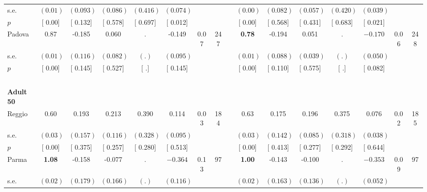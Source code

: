 \begin{longtable}{L{8em} c c c c c c c p{1em} c c c c c c c}
\quad \quad \quad \quad s.e.& $ (     0.01)$ & $ (    0.093)$ & $ (    0.086)$ & $ (    0.416)$ & $ (    0.074)$ & & & & $ (     0.00)$ & $ (    0.082)$ & $ (    0.057)$ & $ (    0.420)$ & $ (    0.039)$ & &  \\*
\quad \quad \quad \quad $ p$ & [     0.00] & [    0.132] & [    0.578] & [    0.697] & [    0.012] & & & & [     0.00] & [    0.568] & [    0.431] & [    0.683] & [    0.021] & &  \\[1em]
\quad \quad \quad Padova& 0.87 &    -0.185 &     0.060 &         . &    -0.149 &      0.07 &       247 & & \textbf{     0.78} &    -0.194 &     0.051 &         . & $ \mathbf{   -0.170}$ &      0.06 &       248  \\*
\quad \quad \quad \quad s.e.& $ (     0.01)$ & $ (    0.116)$ & $ (    0.082)$ & $ (        .)$ & $ (    0.095)$ & & & & $ (     0.01)$ & $ (    0.088)$ & $ (    0.039)$ & $ (        .)$ & $ (    0.050)$ & &  \\*
\quad \quad \quad \quad $ p$ & [     0.00] & [    0.145] & [    0.527] & [        .] & [    0.145] & & & & [     0.00] & [    0.110] & [    0.575] & [        .] & [    0.082] & &  \\[1em]
~\\[1em]
\quad \quad \textbf{Adult 50} & & & & & & & & & & & & & & & \\* 
\quad \quad \quad Reggio& 0.60 &     0.193 &     0.213 &     0.390 &     0.114 &      0.03 &       184 & & 0.63 &     0.175 &     0.196 &     0.375 &     0.076 &      0.02 &       185  \\*
\quad \quad \quad \quad s.e.& $ (     0.03)$ & $ (    0.157)$ & $ (    0.116)$ & $ (    0.328)$ & $ (    0.095)$ & & & & $ (     0.03)$ & $ (    0.142)$ & $ (    0.085)$ & $ (    0.318)$ & $ (    0.038)$ & &  \\*
\quad \quad \quad \quad $ p$ & [     0.00] & [    0.375] & [    0.257] & [    0.280] & [    0.513] & & & & [     0.00] & [    0.413] & [    0.277] & [    0.292] & [    0.644] & &  \\[1em]
\quad \quad \quad Parma& \textbf{     1.08} &    -0.158 &    -0.077 &         . & $ \mathbf{   -0.364}$ &      0.13 &        97 & & \textbf{     1.00} &    -0.143 &    -0.100 &         . & $ \mathbf{   -0.353}$ &      0.09 &        97  \\*
\quad \quad \quad \quad s.e.& $ (     0.02)$ & $ (    0.179)$ & $ (    0.166)$ & $ (        .)$ & $ (    0.116)$ & & & & $ (     0.02)$ & $ (    0.163)$ & $ (    0.136)$ & $ (        .)$ & $ (    0.052)$ & &  \\*

\end{longtable}
